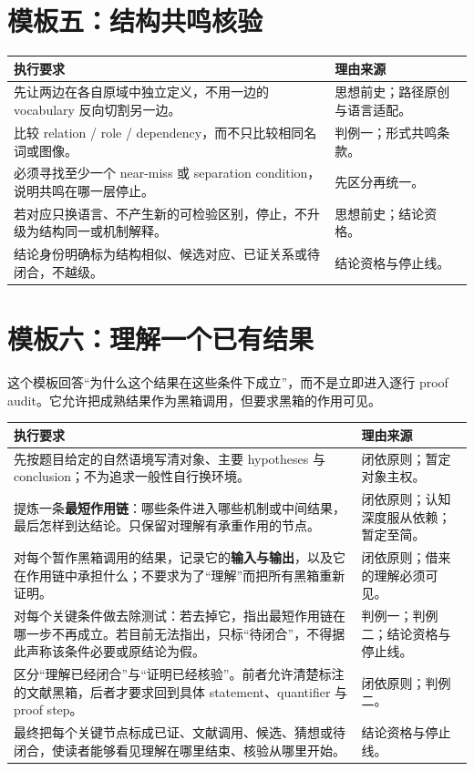 \documentclass[UTF8,zihao=-4,fontset=none,oneside,openany]{ctexbook}
\begin{document}
\section{模板五：结构共鸣核验}
\begin{tabularx}{\textwidth}{@{}X p{53mm}@{}}
\toprule
\textbf{执行要求} & \textbf{理由来源}\\
\midrule
先让两边在各自原域中独立定义，不用一边的 vocabulary 反向切割另一边。 & 思想前史；路径原创与语言适配。\\
比较 relation / role / dependency，而不只比较相同名词或图像。 & 判例一；形式共鸣条款。\\
必须寻找至少一个 near-miss 或 separation condition，说明共鸣在哪一层停止。 & 先区分再统一。\\
若对应只换语言、不产生新的可检验区别，停止，不升级为结构同一或机制解释。 & 思想前史；结论资格。\\
结论身份明确标为结构相似、候选对应、已证关系或待闭合，不越级。 & 结论资格与停止线。\\
\bottomrule
\end{tabularx}


\section{模板六：理解一个已有结果}
这个模板回答“为什么这个结果在这些条件下成立”，而不是立即进入逐行 proof audit。它允许把成熟结果作为黑箱调用，但要求黑箱的作用可见。

\begin{tabularx}{\textwidth}{@{}X p{53mm}@{}}
\toprule
\textbf{执行要求} & \textbf{理由来源}\\
\midrule
先按题目给定的自然语境写清对象、主要 hypotheses 与 conclusion；不为追求一般性自行换环境。 & 闭依原则；暂定对象主权。\\
提炼一条\textbf{最短作用链}：哪些条件进入哪些机制或中间结果，最后怎样到达结论。只保留对理解有承重作用的节点。 & 闭依原则；认知深度服从依赖；暂定至简。\\
对每个暂作黑箱调用的结果，记录它的\textbf{输入与输出}，以及它在作用链中承担什么；不要求为了“理解”而把所有黑箱重新证明。 & 闭依原则；借来的理解必须可见。\\
对每个关键条件做去除测试：若去掉它，指出最短作用链在哪一步不再成立。若目前无法指出，只标“待闭合”，不得据此声称该条件必要或原结论为假。 & 判例一；判例二；结论资格与停止线。\\
区分“理解已经闭合”与“证明已经核验”。前者允许清楚标注的文献黑箱，后者才要求回到具体 statement、quantifier 与 proof step。 & 闭依原则；判例二。\\
最终把每个关键节点标成已证、文献调用、候选、猜想或待闭合，使读者能够看见理解在哪里结束、核验从哪里开始。 & 结论资格与停止线。\\
\bottomrule
\end{tabularx}
\end{document}
